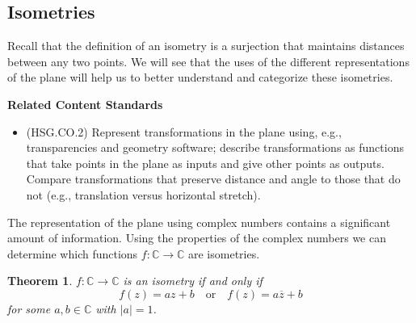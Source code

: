 \documentclass[
]{book}
\providecommand{\tightlist}{%
  \setlength{\itemsep}{0pt}\setlength{\parskip}{0pt}}
\newenvironment{standards}{}{}
\newtheorem{theorem}{Theorem}[chapter]
\theoremstyle{definition}
\theoremstyle{definition}
\theoremstyle{definition}
\theoremstyle{definition}
\theoremstyle{remark}
\begin{document}
\hypertarget{isometries-1}{%
\subsection{Isometries}\label{isometries-1}}

Recall that the definition of an isometry is a surjection that maintains distances between any two points. We will see that the uses of the different representations of the plane will help us to better understand and categorize these isometries.

\begin{standards}

\begin{center}
\textbf{Related Content Standards}

\end{center}

\begin{itemize}
\tightlist
\item
  (HSG.CO.2) Represent transformations in the plane using, e.g., transparencies and geometry software; describe transformations as functions that take points in the plane as inputs and give other points as outputs. Compare transformations that preserve distance and angle to those that do not (e.g., translation versus horizontal stretch).
\end{itemize}

\end{standards}

The representation of the plane using complex numbers contains a significant amount of information. Using the properties of the complex numbers we can determine which functions \(f:\mathbb{C}\rightarrow \mathbb{C}\) are isometries.

\begin{theorem}
\protect\hypertarget{thm:complex-isometry}{}\label{thm:complex-isometry}\(f:\mathbb{C} \rightarrow \mathbb{C}\) is an isometry if and only if \[f(z)= az+b \quad \mbox{or} \quad f(z)=a \overline{z} +b\] for some \(a,b\in \mathbb{C}\) with \(|a|=1\).
\end{theorem}
\end{document}

